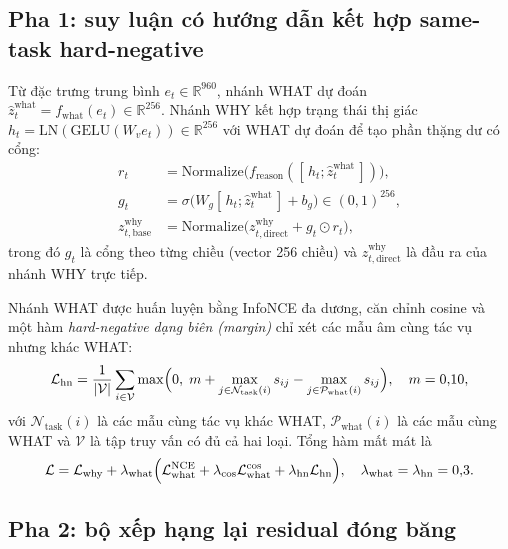 \documentclass[12pt,a4paper]{report}
\begin{document}
\subsection{Pha 1: suy luận có hướng dẫn kết hợp same-task hard-negative}

Từ đặc trưng trung bình $e_t\in\mathbb{R}^{960}$, nhánh WHAT dự đoán $\hat{z}_t^{\mathrm{what}}=f_{\mathrm{what}}(e_t)\in\mathbb{R}^{256}$. Nhánh WHY kết hợp trạng thái thị giác $h_t=\mathrm{LN}(\mathrm{GELU}(W_v e_t))\in\mathbb{R}^{256}$ với WHAT dự đoán để tạo phần thặng dư có cổng:
\begin{align}
    r_t &= \mathrm{Normalize}\bigl(f_{\mathrm{reason}}([\,h_t;\hat{z}_t^{\mathrm{what}}\,])\bigr),\\
    g_t &= \sigma\bigl(W_g[\,h_t;\hat{z}_t^{\mathrm{what}}\,]+b_g\bigr)\in(0,1)^{256},\\
    z_{t,\mathrm{base}}^{\mathrm{why}} &= \mathrm{Normalize}\bigl(z_{t,\mathrm{direct}}^{\mathrm{why}} + g_t\odot r_t\bigr),
\end{align}
trong đó $g_t$ là cổng theo từng chiều (vector 256 chiều) và $z_{t,\mathrm{direct}}^{\mathrm{why}}$ là đầu ra của nhánh WHY trực tiếp.

Nhánh WHAT được huấn luyện bằng InfoNCE đa dương, căn chỉnh cosine và một hàm \emph{hard-negative dạng biên (margin)} chỉ xét các mẫu âm cùng tác vụ nhưng khác WHAT:
\begin{equation}
    \mathcal{L}_{\mathrm{hn}} = \frac{1}{|\mathcal{V}|}\sum_{i\in\mathcal{V}}\max\Bigl(0,\; m + \max_{j\in\mathcal{N}_{\mathrm{task}}(i)}s_{ij} - \max_{j\in\mathcal{P}_{\mathrm{what}}(i)}s_{ij}\Bigr), \quad m=0{,}10,
\end{equation}
với $\mathcal{N}_{\mathrm{task}}(i)$ là các mẫu cùng tác vụ khác WHAT, $\mathcal{P}_{\mathrm{what}}(i)$ là các mẫu cùng WHAT và $\mathcal{V}$ là tập truy vấn có đủ cả hai loại. Tổng hàm mất mát là
\begin{equation}
    \mathcal{L} = \mathcal{L}_{\mathrm{why}} + \lambda_{\mathrm{what}}\Bigl(\mathcal{L}_{\mathrm{what}}^{\mathrm{NCE}} + \lambda_{\cos}\mathcal{L}_{\mathrm{what}}^{\cos} + \lambda_{\mathrm{hn}}\mathcal{L}_{\mathrm{hn}}\Bigr), \quad \lambda_{\mathrm{what}}=\lambda_{\mathrm{hn}}=0{,}3.
\end{equation}

\subsection{Pha 2: bộ xếp hạng lại residual đóng băng}
\end{document}
